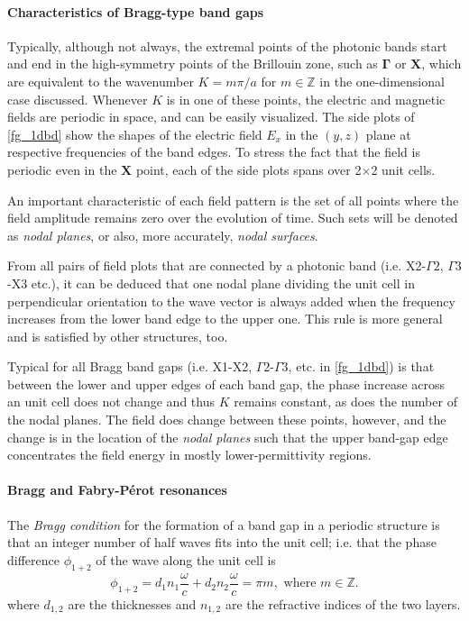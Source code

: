 \paragraph{Characteristics of Bragg-type band gaps}
Typically, although not always, the extremal points of the photonic bands start and end in the high-symmetry points of the Brillouin zone, such as $\mathbf{\Gamma}$ or $\mathbf{X}$, which are equivalent to the wavenumber $K=m\pi/a$ for $m\in\mathbb{Z}$ in the one-dimensional case discussed. Whenever $K$ is in one of these points, the electric and magnetic fields are periodic in space, and can be easily visualized. The side plots of \ref{fg_1dbd} show the shapes of the electric field $E_x$ in the $(y,z)$ plane at respective frequencies of the band edges. To stress the fact that the field is periodic even in the $\mathbf{X}$ point, each of the side plots spans over 2$\times$2 unit cells. 

An important characteristic of each field pattern is the set of all points where the field amplitude remains zero over the evolution of time. Such sets will be denoted as \textit{nodal planes}, or also, more accurately, \textit{nodal surfaces}.

From all pairs of field plots that are connected by a photonic band (i.e. X2-$\Gamma2$, $\Gamma3$-X3 etc.), it can be deduced that one nodal plane dividing the unit cell in perpendicular orientation to the wave vector is always added when the frequency increases from the lower band edge to the upper one. This rule is more general and is satisfied by other structures, too. 

Typical for all Bragg band gaps (i.e. X1-X2, $\Gamma2$-$\Gamma3$, etc. in \ref{fg_1dbd}) is that between the lower and upper edges of each band gap, the phase increase across an unit cell does not change and thus $K$ remains constant, as does the number of the nodal planes. The field does change between these points, however, and the change is in the location of the \textit{nodal planes} such that the upper band-gap edge concentrates the field energy in mostly lower-permittivity regions. 

\paragraph{Bragg and Fabry-Pérot resonances}
The \textit{Bragg condition} for the formation of a band gap in a periodic structure is that an integer number of half waves fits into the unit cell; i.e. that the phase difference $\phi_{1+2}$ of the wave along the unit cell is 
\begin{equation} \phi_{1+2} = d_1 n_1 \frac{\omega}{c} + d_2 n_2 \frac{\omega}{c} = \pi m, \text{ where } m\in \mathbb{Z}. \label{eq_braggcond}\end{equation}
where $d_{1,2}$ are the thicknesses and $n_{1,2}$ are the refractive indices of the two layers.

